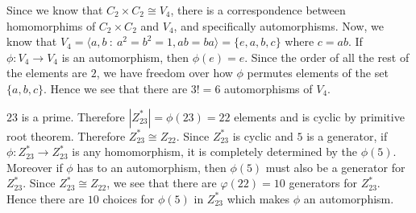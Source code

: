 \documentclass[12pt]{exam}
\theoremstyle{plain} %
\theoremstyle{definition} %
\theoremstyle{remark} %
\begin{document}
\begin{questions}
  \question
  \begin{solution}
    Since we know that $C_2 \times C_2 \cong V_4$, there is a correspondence between homomorphims of $C_2 \times C_2$ and $V_4$, and specifically automorphisms. Now, we know that $V_4 = \langle a, b \ : \ a^2 = b^2 = 1, ab = ba \rangle = \{ e, a, b, c \}$ where $c = ab$. If $\phi: V_4 \to V_4$ is an automorphism, then $\phi(e) = e$. Since the order of all the rest of the elements are $2$, we have freedom over how $\phi$ permutes elements of the set $\{ a, b, c \}$. Hence we see that there are $3! = 6$ automorphisms of $V_4$.
  \end{solution}

  \question
  \begin{solution}
    $23$ is a prime. Therefore $|Z_{23}^*| = \phi(23) = 22$ elements and is cyclic by primitive root theorem. Therefore $Z_{23}^* \cong Z_{22}$. Since $Z_{23}^*$ is cyclic and $5$ is a generator, if $\phi: Z_{23}^* \to Z_{23}^*$ is any homomorphism, it is completely determined by the $\phi(5)$. Moreover if $\phi$ has to an automorphism, then $\phi(5)$ must also be a generator for $Z_{23}^*$. Since $Z_{23}^* \cong Z_{22}$, we see that there are $\varphi(22) = 10$ generators for $Z_{23}^{*}$. Hence there are $10$ choices for $\phi(5)$ in $Z_{23}^*$ which makes $\phi$ an automorphism.
  \end{solution}


\end{questions}
\printbibliography[heading=bibintoc]
\end{document}
